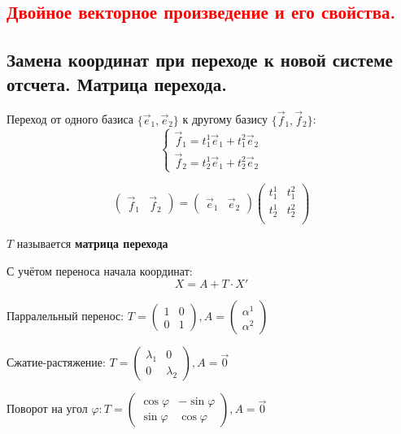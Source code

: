 \subsection{\textcolor{red}{Двойное векторное произведение и его свойства.}}

\subsection{Замена координат при переходе к новой системе отсчета. Матрица перехода.}
Переход от одного базиса $\{\vec e_1, \vec e_2\}$ к другому базису $\{\vec f_1, \vec f_2\}$: $$\begin{cases}
    \vec f_1=t_1^1\vec e_1+t_1^2\vec e_2 \\
    \vec f_2=t_2^1\vec e_1+t_2^2\vec e_2
\end{cases}$$

$$\begin{pmatrix}
    \vec f_1 & \vec f_2
\end{pmatrix} = \begin{pmatrix}
    \vec e_1 & \vec e_2
\end{pmatrix} \begin{pmatrix}
    t_1^1 & t_1^2 \\
    t_2^1 & t_2^2 \\
\end{pmatrix}$$

\begin{definition}
    $T$ называется \textbf{матрица перехода}
\end{definition}

С учётом переноса начала координат: $$X=A+T\cdot X'$$

Парралельный перенос: $T=\begin{pmatrix}
    1 & 0 \\
    0 & 1
\end{pmatrix}, A=\begin{pmatrix}
    \alpha^1 \\
    \alpha^2
\end{pmatrix}$

Сжатие-растяжение: $T=\begin{pmatrix}
    \lambda_1 & 0 \\
    0 & \lambda_2
\end{pmatrix}, A=\vec 0$

Поворот на угол $\varphi: T=\begin{pmatrix}
    \cos\varphi & -\sin\varphi \\
    \sin\varphi & \cos\varphi
\end{pmatrix}, A=\vec 0$

